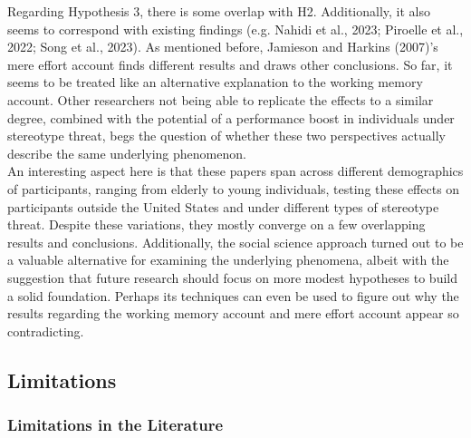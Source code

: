 \documentclass[
  stu, a4paper, 12pt,mask,floatsintext]{apa7}
\begin{document}
Regarding Hypothesis 3, there is some overlap with H2. Additionally, it also seems to correspond with existing findings (e.g. Nahidi et al., 2023; Piroelle et al., 2022; Song et al., 2023).
As mentioned before, Jamieson and Harkins (2007)'s mere effort account finds different results and draws other conclusions.
So far, it seems to be treated like an alternative explanation to the working memory account.
Other researchers not being able to replicate the effects to a similar degree, combined with the potential of a performance boost in individuals under stereotype threat, begs the question of whether these two perspectives actually describe the same underlying phenomenon.\\
An interesting aspect here is that these papers span across different demographics of participants, ranging from elderly to young individuals, testing these effects on participants outside the United States and under different types of stereotype threat.
Despite these variations, they mostly converge on a few overlapping results and conclusions.
Additionally, the social science approach turned out to be a valuable alternative for examining the underlying phenomena, albeit with the suggestion that future research should focus on more modest hypotheses to build a solid foundation.
Perhaps its techniques can even be used to figure out why the results regarding the working memory account and mere effort account appear so contradicting.

\subsection{Limitations}\label{limitations}

\subsubsection{Limitations in the Literature}\label{limitations-in-the-literature}
\end{document}
